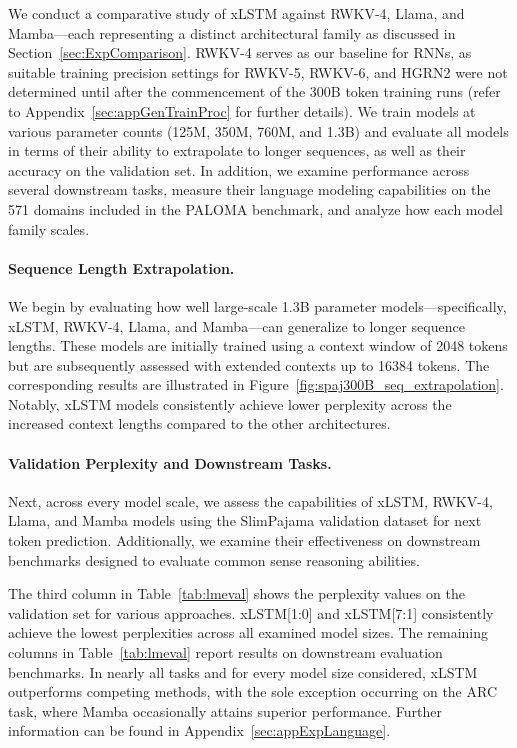 We conduct a comparative study of xLSTM against RWKV-4, Llama, and Mamba—each representing a distinct architectural family as discussed in Section~\ref{sec:ExpComparison}. RWKV-4 serves as our baseline for RNNs, as suitable training precision settings for RWKV-5, RWKV-6, and HGRN2 were not determined until after the commencement of the 300B token training runs (refer to Appendix~\ref{sec:appGenTrainProc} for further details). We train models at various parameter counts (125M, 350M, 760M, and 1.3B) and evaluate all models in terms of their ability to extrapolate to longer sequences, as well as their accuracy on the validation set. In addition, we examine performance across several downstream tasks, measure their language modeling capabilities on the 571 domains included in the PALOMA benchmark, and analyze how each model family scales.

\paragraph{Sequence Length Extrapolation.}
\label{sec:spaj300B_ctx_extrapolation}
We begin by evaluating how well large-scale 1.3B parameter models—specifically, xLSTM, RWKV-4, Llama, and Mamba—can generalize to longer sequence lengths. These models are initially trained using a context window of 2048 tokens but are subsequently assessed with extended contexts up to 16384 tokens. The corresponding results are illustrated in Figure~\ref{fig:spaj300B_seq_extrapolation}. Notably, xLSTM models consistently achieve lower perplexity across the increased context lengths compared to the other architectures.

\paragraph{Validation Perplexity and Downstream Tasks.}
\label{sec:spaj_downstream_eval}
Next, across every model scale, we assess the capabilities of xLSTM, RWKV-4, Llama, and Mamba models using the SlimPajama validation dataset for next token prediction. Additionally, we examine their effectiveness on downstream benchmarks designed to evaluate common sense reasoning abilities.

The third column in Table~\ref{tab:lmeval} shows the perplexity values on the validation set for various approaches. xLSTM[1:0] and xLSTM[7:1] consistently achieve the lowest perplexities across all examined model sizes. The remaining columns in Table~\ref{tab:lmeval} report results on downstream evaluation benchmarks. In nearly all tasks and for every model size considered, xLSTM outperforms competing methods, with the sole exception occurring on the ARC task, where Mamba occasionally attains superior performance. Further information can be found in Appendix~\ref{sec:appExpLanguage}.

